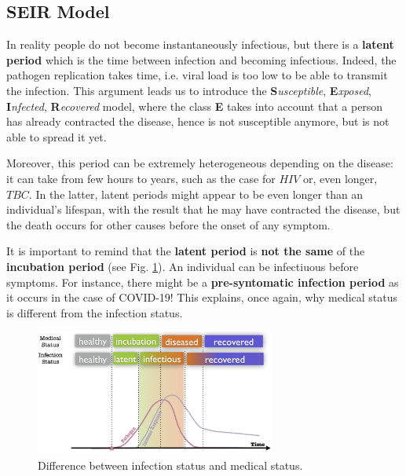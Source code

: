 \documentclass[../main/main.tex]{subfiles}
\begin{document}
\subsection{SEIR Model}

In reality people do not become instantaneously infectious, but there is a \textbf{latent period} which is the time between infection and becoming infectious. Indeed, the pathogen replication takes time, i.e. viral load is too low to be able to transmit the infection. This argument leads us to introduce the \textbf{S}\textit{usceptible},  \textbf{E}\textit{xposed}, \textbf{I}\textit{nfected}, \textbf{R}\textit{ecovered} model, where the class \textbf{E} takes into account that a person has already contracted the disease, hence is not susceptible anymore, but is not able to spread it yet.

Moreover, this period can be extremely heterogeneous depending on the disease: it can take from few hours to years, such as the case for $HIV$ or, even longer, $TBC$. In the latter, latent periods might appear to be even longer than an individual's lifespan, with the result that he may have contracted the disease, but the death occurs for other causes before the onset of any symptom.

It is important to remind that the \textbf{latent period} is \textbf{not the same} of the \textbf{incubation period} (see Fig. \ref{fig:05_1}). An individual can be infectiuous before symptoms. For instance, there might be a \textbf{pre-syntomatic infection period} as it occurs in the case of COVID-19! This explains, once again, why medical status is different from the infection status.

\begin{figure}[h!]
\centering
\includegraphics[width=0.7\textwidth]{../lessons/image/05/1.png}
\caption{\label{fig:05_1} Difference between infection status and medical status.}
\end{figure}
\end{document}
